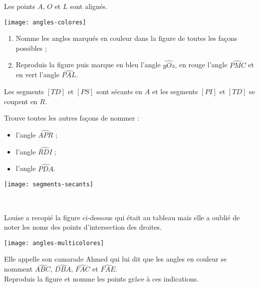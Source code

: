 \newpage






\begin{exercice}
Les points $A$, $O$ et $L$ sont alignés.
 \begin{center} \texttt{[image: angles-colores]}  \end{center}
\begin{enumerate}
 \item Nomme les angles marqués en couleur dans la figure de toutes les façons possibles ; 
 \item Reproduis la figure puis marque en bleu l'angle $\widehat{yOz}$, en rouge l'angle $\widehat{PMC}$ et en vert l'angle $\widehat{PAL}$.
 \end{enumerate}
\end{exercice}


\begin{exercice}
Les segments $[TD]$ et $[PS]$ sont sécants en $A$ et les segments $[PI]$ et $[TD]$ se coupent en $R$.

Trouve toutes les autres façons de nommer : \\[0.5em]
\begin{minipage}[c]{0.2\textwidth}
\begin{itemize}
 \item l'angle $\widehat{APR}$ ;
 \item l'angle $\widehat{RDI}$ ;
 \item l'angle $\widehat{PDA}$.
 \end{itemize}
 \end{minipage} \hfill%
  \begin{minipage}[c]{0.4\textwidth}
  \texttt{[image: segments-secants]}
  \end{minipage} \\
\end{exercice}  


\begin{exercice}
Louise a recopié la figure ci‑dessous qui était au tableau mais elle a oublié de noter les noms des points d'intersection des droites. 
 \begin{center} \texttt{[image: angles-multicolores]}  \end{center}
Elle appelle son camarade Ahmed qui lui dit que les angles en couleur se nomment $\widehat{ABC}$, $\widehat{DBA}$, $\widehat{FAC}$ et $\widehat{FAE}$. \\[0.5em]
Reproduis la figure et nomme les points grâce à ces indications.
\end{exercice}  


